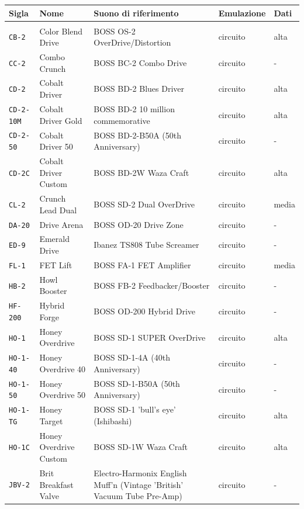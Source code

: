 \begin{xltabular}{\linewidth}{@{}l l X l l@{}}
\toprule \textbf{Sigla} & \textbf{Nome} & \textbf{Suono di riferimento} & \textbf{Emulazione} & \textbf{Dati}\\ \midrule
\endhead
\bottomrule \endfoot
{}\\
\texttt{CB-2} & Color Blend Drive & BOSS OS-2 OverDrive/Distortion & circuito & alta\\
\texttt{CC-2} & Combo Crunch & BOSS BC-2 Combo Drive & circuito & -\\
\texttt{CD-2} & Cobalt Driver & BOSS BD-2 Blues Driver & circuito & alta\\
\texttt{CD-2-10M} & Cobalt Driver Gold & BOSS BD-2 10 million commemorative & circuito & alta\\
\texttt{CD-2-50} & Cobalt Driver 50 & BOSS BD-2-B50A (50th Anniversary) & circuito & -\\
\texttt{CD-2C} & Cobalt Driver Custom & BOSS BD-2W Waza Craft & circuito & alta\\
\texttt{CL-2} & Crunch Lead Dual & BOSS SD-2 Dual OverDrive & circuito & media\\
\texttt{DA-20} & Drive Arena & BOSS OD-20 Drive Zone & circuito & -\\
\texttt{ED-9} & Emerald Drive & Ibanez TS808 Tube Screamer & circuito & -\\
\texttt{FL-1} & FET Lift & BOSS FA-1 FET Amplifier & circuito & media\\
\texttt{HB-2} & Howl Booster & BOSS FB-2 Feedbacker/Booster & circuito & -\\
\texttt{HF-200} & Hybrid Forge & BOSS OD-200 Hybrid Drive & circuito & -\\
\texttt{HO-1} & Honey Overdrive & BOSS SD-1 SUPER OverDrive & circuito & alta\\
\texttt{HO-1-40} & Honey Overdrive 40 & BOSS SD-1-4A (40th Anniversary) & circuito & -\\
\texttt{HO-1-50} & Honey Overdrive 50 & BOSS SD-1-B50A (50th Anniversary) & circuito & -\\
\texttt{HO-1-TG} & Honey Target & BOSS SD-1 'bull's eye' (Ishibashi) & circuito & alta\\
\texttt{HO-1C} & Honey Overdrive Custom & BOSS SD-1W Waza Craft & circuito & alta\\
\texttt{JBV-2} & Brit Breakfast Valve & Electro-Harmonix English Muff'n (Vintage 'British' Vacuum Tube Pre-Amp) & circuito & -\\

\end{xltabular}
